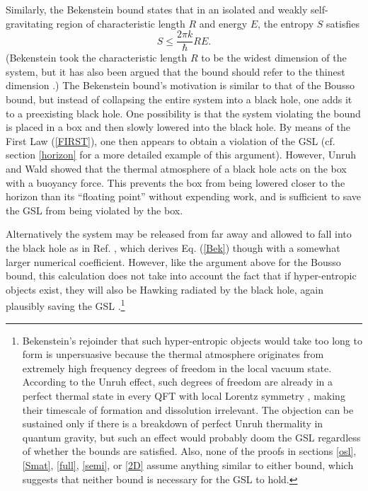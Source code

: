 \documentclass[12pt]{article}
\begin{document}
Similarly, the Bekenstein bound states \cite{bek81} that in an isolated and weakly self-gravitating region of characteristic length $R$ and energy $E$, the entropy $S$ satisfies
\begin{equation}\label{Bek}
S \le \frac{2\pi k}{\hbar}RE.
\end{equation}
(Bekenstein took the characteristic length $R$ to be the widest dimension of the system, but it has also been argued that the bound should refer to the thinest dimension \cite{bousso02}.)  The Bekenstein bound's motivation is similar to that of the Bousso bound, but instead of collapsing the entire system into a black hole, one adds it to a preexisting black hole.  One possibility is that the system violating the bound is placed in a box and then slowly lowered into the black hole.  By means of the First Law (\ref{FIRST}), one then appears to obtain a violation of the GSL \cite{bek81} (cf. section \ref{horizon} for a more detailed example of this argument).  However, Unruh and Wald \cite{UW82} showed that the thermal atmosphere of a black hole acts on the box with a buoyancy force.  This prevents the box from being lowered closer to the horizon than its ``floating point'' without expending work, and is sufficient to save the GSL from being violated by the box.

Alternatively the system may be released from far away and allowed to fall into the black hole as in Ref. \cite{bek01}, which derives Eq. (\ref{Bek}) though with a somewhat larger numerical coefficient.  However, like the argument above for the Bousso bound, this calculation does not take into account the fact that if hyper-entropic objects exist, they will also be Hawking radiated by the black hole, again plausibly saving the GSL \cite{MS03}.\footnote{Bekenstein's rejoinder \cite{bek04} that such hyper-entropic objects would take too long to form is unpersuasive because the thermal atmosphere originates from extremely high frequency degrees of freedom in the local vacuum state.  According to the Unruh effect, such degrees of freedom are already in a perfect thermal state in every QFT with local Lorentz symmetry \cite{BWUW}, making their timescale of formation and dissolution irrelevant.  The objection can be sustained only if there is a breakdown of perfect Unruh thermality in quantum gravity, but such an effect would probably doom the GSL regardless of whether the bounds are satisfied.  Also, none of the proofs in sections \ref{osl}, \ref{Smat}, \ref{full}, \ref{semi}, or \ref{2D} assume anything similar to either bound, which suggests that neither bound is necessary for the GSL to hold.}
\end{document}
